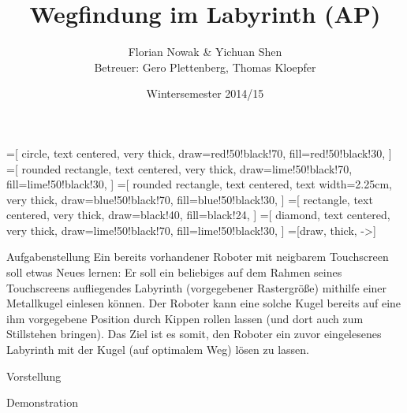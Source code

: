 \documentclass{beamer}
\title{Wegfindung im Labyrinth (AP)}
\author{\texorpdfstring{Florian Nowak \& Yichuan Shen\\ Betreuer: Gero Plettenberg, Thomas Kloepfer}{Florian Nowak \& Yichuan Shen}}
\date{Wintersemester 2014/15}
\begin{document}
\maketitle

=[
  circle,
  text centered,
  very thick,
  draw=red!50!black!70,
  fill=red!50!black!30,
  ]
=[
  rounded rectangle,
  text centered,
  very thick,
  draw=lime!50!black!70,
  fill=lime!50!black!30,
  ]
=[
  rounded rectangle,
  text centered,
  text width=2.25cm,
  very thick,
  draw=blue!50!black!70,
  fill=blue!50!black!30,
  ]
=[
  rectangle,
  text centered,
  very thick,
  draw=black!40,
  fill=black!24,
  ]
=[
  diamond,
  text centered,
  very thick,
  draw=lime!50!black!70,
  fill=lime!50!black!30,
  ]
=[draw, thick, ->]


\begin{frame}[fragile,t]{Aufgabenstellung}
Ein bereits vorhandener Roboter mit neigbarem Touchscreen soll etwas Neues lernen: Er soll ein beliebiges auf dem Rahmen seines Touchscreens aufliegendes Labyrinth (vorgegebener Rastergröße) mithilfe einer Metallkugel einlesen können. Der Roboter kann eine solche Kugel bereits auf eine ihm vorgegebene Position durch Kippen rollen lassen (und dort auch zum Stillstehen bringen). Das Ziel ist es somit, den Roboter ein zuvor eingelesenes Labyrinth mit der Kugel (auf optimalem Weg) lösen zu lassen.

\medskip\noindent
{}
\end{frame}

\begin{frame}[fragile,t]{Vorstellung}
\end{frame}

\begin{frame}[fragile,t]{Demonstration}
\end{frame}
\end{document}
